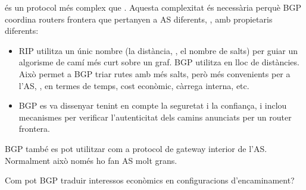 \begin{itemize}
 és un protocol més complex que . Aquesta complexitat
és necessària perquè BGP coordina routers frontera que pertanyen a AS diferents, \ie,
amb propietaris diferents:\\[-0.4cm]
\begin{itemize}
\item RIP utilitza un únic nombre (la distància, \ie, el nombre de salts)
per guiar un algorisme de camí més curt sobre un graf. BGP utilitza  en lloc de distàncies.
Això permet a BGP triar rutes amb més salts, però més convenients per a l'AS,
\eg, en termes de temps, cost econòmic, càrrega interna, etc.\\[-0.4cm]

\item BGP es va dissenyar tenint en compte la seguretat i la confiança, i inclou mecanismes
per verificar l'autenticitat dels camins anunciats per un router frontera.
\end{itemize}
\end{itemize}

\begin{remark}
BGP també es pot utilitzar com a protocol de gateway interior de l'AS.
Normalment això només ho fan AS molt grans.
\end{remark}

\begin{exercise}
Com pot BGP traduir interessos econòmics en configuracions d'encaminament?
\end{exercise}

